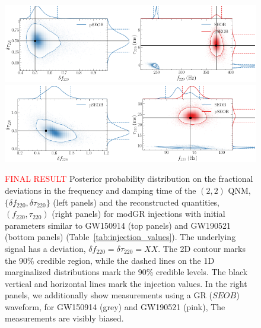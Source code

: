 \documentclass[twocolumn,prd,aps,superscriptaddress,preprintnumbers,tightenlines,showpacs,nofootinbib,eqsecnum,amsfonts,amsmath]{revtex4-1}
\newcommand{\df}[1]{\delta f_{\text{#1}}}
\newcommand{\dtau}[1]{\delta \tau_{\text{#1}}}
\newcommand{\fngr}[1]{f_{\text{#1}}}
\newcommand{\taungr}[1]{\tau_{\text{#1}}}
\begin{document}
\begin{figure}%
\begin{center}
	\includegraphics[width=0.5\textwidth]{figures/GW150914_simulated_signal_0p5_deltaf220_deltatau220.png}\includegraphics[width=0.5\textwidth]{figures/GW150914_simulated_signal_0p5_gr_ngr_fngrtaungr.png}	
	\includegraphics[width=0.5\textwidth]{figures/GW190521_simulated_signal_0p5_deltaf220_deltatau220.png}\includegraphics[width=0.5\textwidth]{figures/GW190521_simulated_signal_0p5_gr_ngr_fngrtaungr.png}
	\caption{\textcolor{red}{FINAL RESULT} Posterior probability distribution on the fractional deviations in the frequency and damping time of the $(2,2)$ QNM, $\{\df{220},\dtau{220}\}$ (left panels) and the reconstructed quantities, $(\fngr{220}, \taungr{220})$ (right panels) for modGR injections with initial parameters similar to GW150914 (top panels) and GW190521 (bottom panels) (Table~\ref{tab:injection_values}). The underlying signal has a deviation, $\df{220} = \dtau{220} = XX$. The 2D contour marks the 90\% credible region, while the dashed lines on the 1D marginalized distributions mark the 90\% credible levels. The black vertical and horizontal lines mark the injection values. In the right panels, we additionally show measurements using a GR ($SEOB$) waveform, for GW150914 (grey) and GW190521 (pink), The measurements are visibly biased.}
	\label{fig:simulated_signal_nonGR}
\end{center}
\end{figure}
\end{document}
